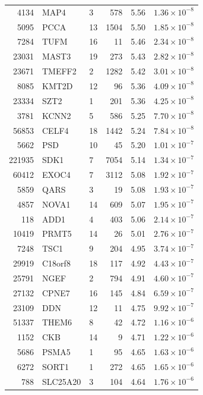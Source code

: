 \begin{table}[ht]
\begin{tabular}{rllrrr}
  4134 & MAP4 & 3 & 578 & 5.56 & $1.36 \times 10^{-8}$ \\ 
  5095 & PCCA & 13 & 1504 & 5.50 & $1.85 \times 10^{-8}$ \\ 
  7284 & TUFM & 16 &  11 & 5.46 & $2.34 \times 10^{-8}$ \\ 
  23031 & MAST3 & 19 & 273 & 5.43 & $2.82 \times 10^{-8}$ \\ 
  23671 & TMEFF2 & 2 & 1282 & 5.42 & $3.01 \times 10^{-8}$ \\ 
  8085 & KMT2D & 12 &  96 & 5.36 & $4.09 \times 10^{-8}$ \\ 
  23334 & SZT2 & 1 & 201 & 5.36 & $4.25 \times 10^{-8}$ \\ 
  3781 & KCNN2 & 5 & 586 & 5.25 & $7.70 \times 10^{-8}$ \\ 
  56853 & CELF4 & 18 & 1442 & 5.24 & $7.84 \times 10^{-8}$ \\ 
  5662 & PSD & 10 &  45 & 5.20 & $1.01 \times 10^{-7}$ \\ 
  221935 & SDK1 & 7 & 7054 & 5.14 & $1.34 \times 10^{-7}$ \\ 
  60412 & EXOC4 & 7 & 3112 & 5.08 & $1.92 \times 10^{-7}$ \\ 
  5859 & QARS & 3 &  19 & 5.08 & $1.93 \times 10^{-7}$ \\ 
  4857 & NOVA1 & 14 & 609 & 5.07 & $1.95 \times 10^{-7}$ \\ 
  118 & ADD1 & 4 & 403 & 5.06 & $2.14 \times 10^{-7}$ \\ 
  10419 & PRMT5 & 14 &  26 & 5.01 & $2.76 \times 10^{-7}$ \\ 
  7248 & TSC1 & 9 & 204 & 4.95 & $3.74 \times 10^{-7}$ \\ 
  29919 & C18orf8 & 18 & 117 & 4.92 & $4.43 \times 10^{-7}$ \\ 
  25791 & NGEF & 2 & 794 & 4.91 & $4.60 \times 10^{-7}$ \\ 
  27132 & CPNE7 & 16 & 145 & 4.84 & $6.59 \times 10^{-7}$ \\ 
  23109 & DDN & 12 &  11 & 4.75 & $9.92 \times 10^{-7}$ \\ 
  51337 & THEM6 & 8 &  42 & 4.72 & $1.16 \times 10^{-6}$ \\ 
  1152 & CKB & 14 &   9 & 4.71 & $1.22 \times 10^{-6}$ \\ 
  5686 & PSMA5 & 1 &  95 & 4.65 & $1.63 \times 10^{-6}$ \\ 
  6272 & SORT1 & 1 & 272 & 4.65 & $1.65 \times 10^{-6}$ \\ 
  788 & SLC25A20 & 3 & 104 & 4.64 & $1.76 \times 10^{-6}$ \\ 

\end{tabular}
\end{table}
